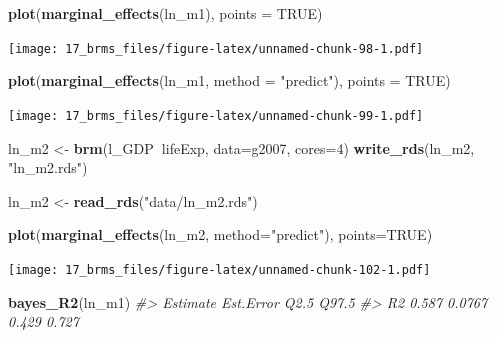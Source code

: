 \documentclass[]{book}
\newenvironment{Shaded}{\begin{snugshade}}{\end{snugshade}}
\newcommand{\CommentTok}[1]{\textcolor[rgb]{0.56,0.35,0.01}{\textit{#1}}}
\newcommand{\DataTypeTok}[1]{\textcolor[rgb]{0.13,0.29,0.53}{#1}}
\newcommand{\DecValTok}[1]{\textcolor[rgb]{0.00,0.00,0.81}{#1}}
\newcommand{\KeywordTok}[1]{\textcolor[rgb]{0.13,0.29,0.53}{\textbf{#1}}}
\newcommand{\NormalTok}[1]{#1}
\newcommand{\OperatorTok}[1]{\textcolor[rgb]{0.81,0.36,0.00}{\textbf{#1}}}
\newcommand{\OtherTok}[1]{\textcolor[rgb]{0.56,0.35,0.01}{#1}}
\newcommand{\StringTok}[1]{\textcolor[rgb]{0.31,0.60,0.02}{#1}}
\begin{document}
\begin{Shaded}
\begin{Highlighting}[]
\KeywordTok{plot}\NormalTok{(}\KeywordTok{marginal_effects}\NormalTok{(ln_m1), }\DataTypeTok{points =} \OtherTok{TRUE}\NormalTok{)}
\end{Highlighting}
\end{Shaded}

\texttt{[image: 17\_brms\_files/figure-latex/unnamed-chunk-98-1.pdf]}

\begin{Shaded}
\begin{Highlighting}[]
\KeywordTok{plot}\NormalTok{(}\KeywordTok{marginal_effects}\NormalTok{(ln_m1, }\DataTypeTok{method =} \StringTok{"predict"}\NormalTok{), }\DataTypeTok{points =} \OtherTok{TRUE}\NormalTok{)}
\end{Highlighting}
\end{Shaded}

\texttt{[image: 17\_brms\_files/figure-latex/unnamed-chunk-99-1.pdf]}

\begin{Shaded}
\begin{Highlighting}[]
\NormalTok{ln_m2 <-}\StringTok{ }\KeywordTok{brm}\NormalTok{(l_GDP}\OperatorTok{~}\NormalTok{lifeExp, }\DataTypeTok{data=}\NormalTok{g2007, }\DataTypeTok{cores=}\DecValTok{4}\NormalTok{)}
\KeywordTok{write_rds}\NormalTok{(ln_m2, }\StringTok{"ln_m2.rds"}\NormalTok{)}
\end{Highlighting}
\end{Shaded}

\begin{Shaded}
\begin{Highlighting}[]
\NormalTok{ln_m2 <-}\StringTok{ }\KeywordTok{read_rds}\NormalTok{(}\StringTok{"data/ln_m2.rds"}\NormalTok{)}
\end{Highlighting}
\end{Shaded}

\begin{Shaded}
\begin{Highlighting}[]
\KeywordTok{plot}\NormalTok{(}\KeywordTok{marginal_effects}\NormalTok{(ln_m2, }\DataTypeTok{method=}\StringTok{"predict"}\NormalTok{), }\DataTypeTok{points=}\OtherTok{TRUE}\NormalTok{)}
\end{Highlighting}
\end{Shaded}

\texttt{[image: 17\_brms\_files/figure-latex/unnamed-chunk-102-1.pdf]}

\begin{Shaded}
\begin{Highlighting}[]
\KeywordTok{bayes_R2}\NormalTok{(ln_m1)}
\CommentTok{#>    Estimate Est.Error  Q2.5 Q97.5}
\CommentTok{#> R2    0.587    0.0767 0.429 0.727}
\end{Highlighting}
\end{Shaded}
\end{document}
